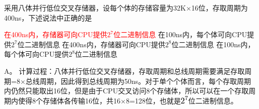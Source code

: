 \question 采用八体并行低位交叉存储器，设每个体的存储容量为32K×16位，存取周期为400ns，下述说法中正确的是
\par\fourch
{\textcolor{red}{在400ns内，存储器可向CPU提供$2^7$位二进制信息}}
{在100ns内，每个体可向CPU提供$2^7$位二进制信息}
{在400ns内，存储器可向CPU提供$2^8$位二进制信息}
{在100ns内，每个体可向CPU提供$2^8$位二进制信息}
\begin{solution}A。
计算过程：八体并行低位交叉存储器，存取周期和总线周期需要满足存取周期=8×总线周期，因此得到总线周期为50ns。对于单个个体而言，每个存取周期内仍然只能取出16位，但是由于CPU交叉访问8个存储体，所以可以在一个存取周期内使得8个存储体各传输16位，共16×8=128位，也就是\includegraphics[width=0.15625in,height=0.15625in]{texmath/a136d35Cdpi7B3507D25E7}位二进制信息。
\end{solution}

